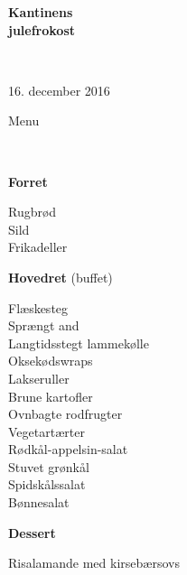 \begin{center}
\begin{HUGE}
\textbf{Kantinens \\[3mm] julefrokost}
\end{HUGE}
\\[.6cm]
\begin{Large}
16. december 2016
\end{Large}
\end{center}
\vspace*{.01cm}
\begin{center}
\begin{huge}
Menu
\end{huge}
\\[.1cm]
\end{center}
\newcommand{\course}[1]{\vspace*{4mm} \textbf{#1} \vspace{-7mm}}
\newcommand{\goodindent}{\null\hspace{23mm}}
{\small
\begin{center}
\course{Forret}
\end{center}
  \goodindent Rugbrød
\\\goodindent Sild
\\\goodindent Frikadeller

\begin{center}
\course{Hovedret} (buffet)
\end{center}
  \goodindent Flæskesteg
\\\goodindent Sprængt and
\\\goodindent Langtidsstegt lammekølle
\\\goodindent Oksekødswraps
\\\goodindent Lakseruller
\\\goodindent Brune kartofler
\\\goodindent Ovnbagte rodfrugter
\\\goodindent Vegetartærter
\\\goodindent Rødkål-appelsin-salat
\\\goodindent Stuvet grønkål
\\\goodindent Spidskålssalat
\\\goodindent Bønnesalat

\begin{center}
\course{Dessert}
\end{center}
  \goodindent Risalamande med kirsebærsovs
}
